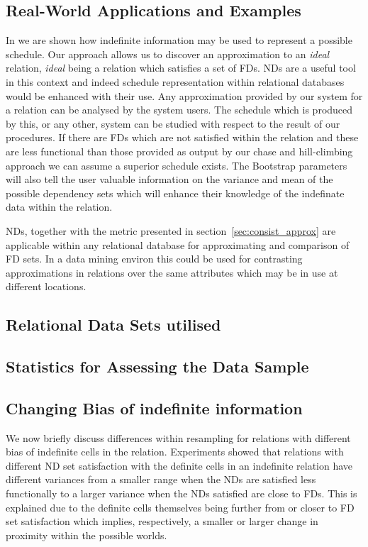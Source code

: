 \subsection{Real-World Applications and Examples}\label{sec:apps}
 
In \cite{inv91} we are shown how indefinite information may be used to
represent a possible schedule. Our approach allows us to discover an
approximation to an {\em ideal} relation, {\em ideal} being a relation
which satisfies
a set of FDs. NDs are a useful tool in this context and indeed 
schedule representation within relational databases would be enhanced with
their use. Any approximation
provided by our system for a relation can be analysed by the system
users. The schedule which is produced by this, or any other, system can
be studied with respect to the result of our procedures. If there are
FDs which are not satisfied within the relation and these are less
functional than those provided as output by our chase and hill-climbing
approach we can assume a superior schedule exists. The Bootstrap
parameters will also tell the user valuable information on the
variance and mean of the possible dependency sets which will enhance
their knowledge of the indefinate data within the relation.

\medskip
 
NDs, together with the metric presented in section~\ref{sec:consist_approx} are applicable
within any relational database for approximating and comparison of FD sets.
In a data mining environ this could be used for contrasting approximations
in relations over the same attributes which may be in use at different
locations.


\subsection{Relational Data Sets utilised}

\subsection{Statistics for Assessing the Data Sample}

\subsection{Changing Bias of indefinite
information}\label{subsec:cp_bias}

We now briefly discuss differences within resampling for relations
with different bias of indefinite cells in the relation. Experiments
showed that relations with different ND set satisfaction with the
definite cells in an indefinite relation have different variances
from a smaller range when the NDs are satisfied less functionally to a
larger variance when the NDs satisfied are close to FDs. This is
explained due to the definite cells themselves being further from or
closer to FD set satisfaction which implies, respectively, a smaller
or larger change in proximity within the possible worlds.

